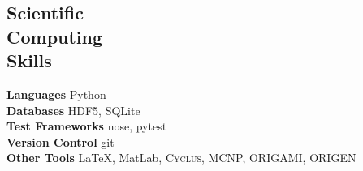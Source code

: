 \documentclass[margin,line]{resume}
\newcommand{\Cyclus}{\textsc{Cyclus}\xspace}%
\begin{document}
\begin{resume}
    \section{\mysidestyle Scientific\\Computing\\Skills}
        \textbf{Languages} \hfill Python\vspace{.5mm}\\%
        \textbf{Databases} \hfill HDF5, SQLite\vspace{.5mm}\\%
        \textbf{Test Frameworks} \hfill nose, pytest\vspace{.5mm}\\%
        \textbf{Version Control} \hfill git\vspace{.5mm}\\%
        \textbf{Other Tools} \hfill \LaTeX, MatLab, \Cyclus, MCNP, ORIGAMI, ORIGEN\vspace{.5mm}%

\end{resume}
\end{document}
